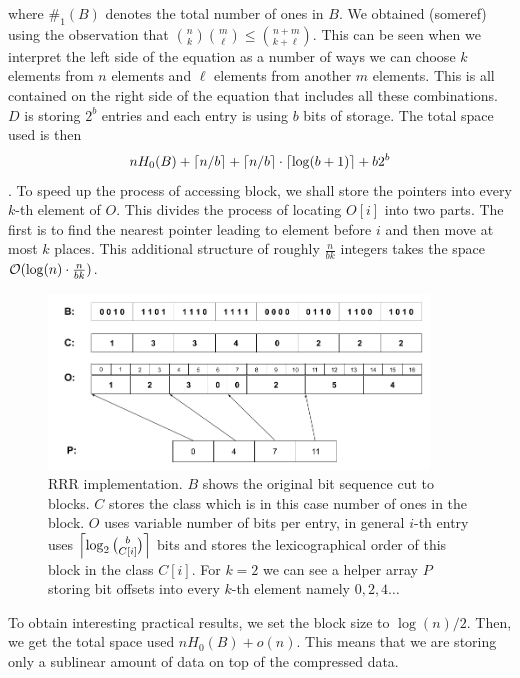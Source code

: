 where $\#_1(B)$ denotes the total number of ones in $B$. We obtained (someref) using the
observation that ${n\choose k} {m\choose \ell} \leq {n+m\choose k+\ell}$. This can be seen
when we interpret the left side of the equation as a number of ways we can choose $k$ elements
from $n$ elements and $\ell$ elements from another $m$ elements. This is all contained on the
right side of the equation that includes all these combinations. $D$ is storing $2^b$ entries
and each entry is using $b$ bits of storage.
The total space used is then $$nH_0(B) + \left\lceil n/b \right\rceil + \left\lceil n/b \right\rceil \cdot \left\lceil \log(b+1) \right\rceil + b2^b$$.
To speed up the process of accessing block, we shall store the pointers into every $k$-th element
of $O$. This divides the process of locating $O[i]$ into two parts. The first is to find the nearest
pointer leading to element before $i$ and then move at most $k$ places. This additional structure of
roughly $\frac{n}{bk}$ integers takes the space $\mathcal{O}(\log(n)\cdot \frac{n}{bk})$.

\begin{figure}
	\centerline{
		\includegraphics[width=0.9\textwidth, height=0.3\textheight]{images/rrr}
	}
	\caption[TODO]{RRR implementation. $B$ shows the original bit sequence cut to
    blocks. $C$ stores the class which is in this case number of ones in the block.
    $O$ uses variable number of bits per entry, in general $i$-th entry uses
    $\left\lceil \log_2{b\choose C[i]} \right\rceil$ bits and stores the lexicographical order
    of this block in the class $C[i]$. For $k=2$ we can see a helper array $P$
    storing bit offsets into every $k$-th element namely $0, 2, 4\ldots$
	}
	\label{obr:RRRFinal}
\end{figure}

To obtain interesting practical results, we set the block size to $\log(n)/2$. Then, we
get the total space used $nH_0(B) + o(n)$. This means that we are storing only a sublinear
amount of data on top of the compressed data.

